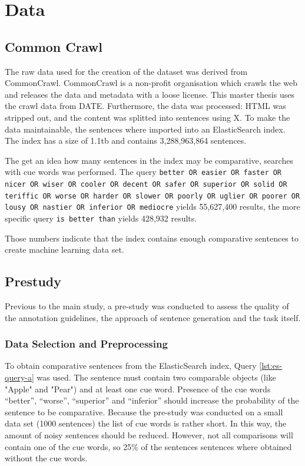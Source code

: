 \chapter{Data}
\section{Common Crawl}
The raw data used for the creation of the dataset was derived from CommonCrawl. CommonCrawl is a non-profit organisation which crawls the web and releases the data and metadata with a loose license. This master thesis uses the crawl data from DATE. Furthermore, the data was processed: HTML was stripped out, and the content was splitted into sentences using X. To make the data maintainable, the sentences where imported into an ElasticSearch index. The index has a size of 1.1tb and contains 3,288,963,864 sentences.

The get an idea how many sentences in the index may be comparative, searches with cue words was performed. The query \texttt{better OR easier OR faster OR nicer OR wiser OR cooler OR decent OR safer OR superior OR solid OR teriffic OR worse OR harder OR slower OR poorly OR uglier OR poorer OR lousy OR nastier OR inferior OR mediocre} yields 55,627,400 results, the more specific query \texttt{is better than} yields 428,932 results.

Those numbers indicate that the index contains enough comparative sentences to create machine learning data set.

\section{Prestudy}
Previous to the main study, a pre-study was conducted to assess the quality of the annotation guidelines, the approach of sentence generation and the task itself.


\subsection{Data Selection and Preprocessing}
\label{sec:prestudy-processing}
To obtain comparative sentences from the ElasticSearch index, Query \ref{lst:es-query-a} was used. The sentence must contain two comparable objects (like "Apple" and "Pear") and at least one cue word. Presence of the cue words \enquote{better}, \enquote{worse}, \enquote{superior} and \enquote{inferior} should increase the probability of the sentence to be comparative. Because the pre-study was conducted on a small data set (1000 sentences) the list of cue words is rather short. In this way, the amount of noisy sentences should be reduced.
However, not all comparisons will contain one of the cue words, so 25\% of the sentences sentences where obtained without the cue words.


